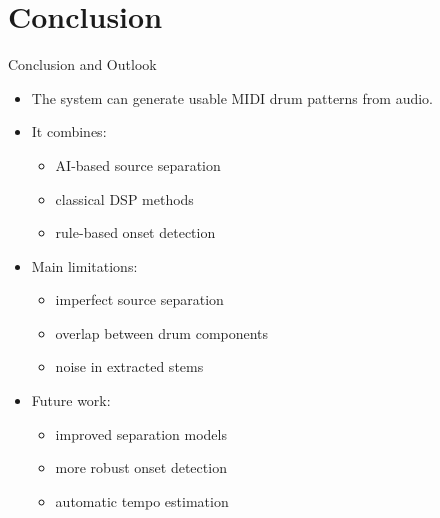 \documentclass[aspectratio=169]{beamer}
\begin{document}
\section{Conclusion}

\begin{frame}{Conclusion and Outlook}
    \begin{itemize}
        \item The system can generate usable MIDI drum patterns from audio.
        \item It combines:
        \begin{itemize}
            \item AI-based source separation
            \item classical DSP methods
            \item rule-based onset detection
        \end{itemize}
        \item Main limitations:
        \begin{itemize}
            \item imperfect source separation
            \item overlap between drum components
            \item noise in extracted stems
        \end{itemize}
        \item Future work:
        \begin{itemize}
            \item improved separation models
            \item more robust onset detection
            \item automatic tempo estimation
        \end{itemize}
    \end{itemize}
\end{frame}
\end{document}
